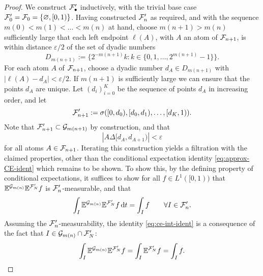 \begin{proof}
  We construct $\mathcal{F}'_{\bullet}$ inductively, with the trivial base case $\mathcal{F}'_{0} = \mathcal{F}_{0} = \{\varnothing, [0,1)\}$.
  Having constructed $\mathcal{F}'_{n}$ as required, and with the sequence $m(0) < m(1) < \ldots < m(n)$ at hand, choose $m(n+1) > m(n)$ sufficiently large that each left endpoint $\ell(A)$, with $A$ an atom of $\mathcal{F}_{n+1}$, is within distance $\varepsilon/2$ of the set of dyadic numbers
  \begin{equation*}
    D_{m(n+1)} := \{2^{-m(n+1)}k : k \in \{0,1,\ldots,2^{m(n+1)} - 1\}\}.
  \end{equation*}
  For each atom $A$ of $\mathcal{F}_{n+1}$, choose a dyadic number $d_{A} \in D_{m(n+1)}$ with $|\ell(A) - d_{A}| < \varepsilon/2$.
  If $m(n+1)$ is sufficiently large we can ensure that the points $d_{A}$ are unique.
  Let $(d_{i})_{i=0}^{K}$ be the sequence of points $d_{A}$ in increasing order, and let
  \begin{equation*}
    \mathcal{F}'_{n+1} := \sigma([0,d_{0}), [d_{0}, d_{1}), \ldots, [d_{K},1)).
  \end{equation*}
  Note that $\mathcal{F}'_{n+1} \subset \mathcal{G}_{m(n+1)}$ by construction, and that
  \begin{equation*}
    |A \Delta [d_{A}, d_{A+1})| < \varepsilon
  \end{equation*}
  for all atoms $A \in \mathcal{F}_{n+1}$.
  Iterating this construction yields a filtration with the claimed properties, other than the conditional expectation identity \eqref{eq:approx-CE-ident} which remains to be shown.
  To show this, by the defining property of conditional expectations, it suffices to show for all $f \in L^1([0,1))$ that $\mathbb{E}^{\mathcal{G}_{m(n)}} \mathbb{E}^{\mathcal{F}_{N}'} f$ is $\mathcal{F}_{n}'$-measurable, and that
  \begin{equation}\label{eq:ce-int-ident}
    \int_{I} \mathbb{E}^{\mathcal{G}_{m(n)}} \mathbb{E}^{\mathcal{F}_{N}'} f \, \mathrm{d} t = \int_{I} f \qquad \forall I \in \mathcal{F}_{n}'.
  \end{equation}
  Assuming the $\mathcal{F}_{n}'$-measurability, the identity \eqref{eq:ce-int-ident} is a consequence of the fact that $I \in \mathcal{G}_{m(n)} \cap \mathcal{F}_{N}'$:
  \begin{equation*}
    \begin{aligned}
      \int_{I} \mathbb{E}^{\mathcal{G}_{m(n)}} \mathbb{E}^{\mathcal{F}_{N}'} f
      = \int_{I} \mathbb{E}^{\mathcal{F}_{N}'} f
      = \int_{I} f.
    \end{aligned}
  \end{equation*}

\end{proof}
